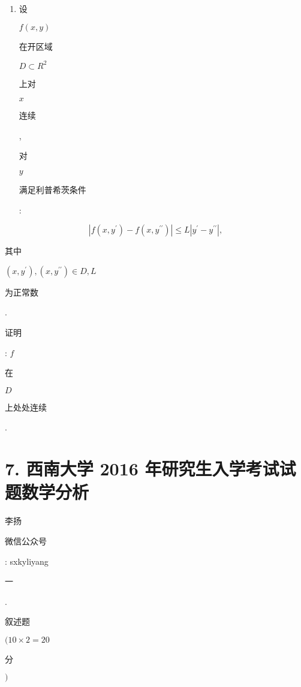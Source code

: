 \documentclass[10pt]{article}
\begin{document}
\begin{enumerate}
  \item \begin{CJK}{UTF8}{mj}设\end{CJK} $f(x, y)$ \begin{CJK}{UTF8}{mj}在开区域\end{CJK} $D \subset R^{2}$ \begin{CJK}{UTF8}{mj}上对\end{CJK} $x$ \begin{CJK}{UTF8}{mj}连续\end{CJK}, \begin{CJK}{UTF8}{mj}对\end{CJK} $y$ \begin{CJK}{UTF8}{mj}满足利普希茨条件\end{CJK}:

\end{enumerate}
$$
\left|f\left(x, y^{\prime}\right)-f\left(x, y^{\prime \prime}\right)\right| \leqslant L\left|y^{\prime}-y^{\prime \prime}\right|,
$$
\begin{CJK}{UTF8}{mj}其中\end{CJK} $\left(x, y^{\prime}\right),\left(x, y^{\prime \prime}\right) \in D, L$ \begin{CJK}{UTF8}{mj}为正常数\end{CJK}. \begin{CJK}{UTF8}{mj}证明\end{CJK}: $f$ \begin{CJK}{UTF8}{mj}在\end{CJK} $D$ \begin{CJK}{UTF8}{mj}上处处连续\end{CJK}.

\section{7. 西南大学 2016 年研究生入学考试试题数学分析}
\begin{CJK}{UTF8}{mj}李扬\end{CJK}

\begin{CJK}{UTF8}{mj}微信公众号\end{CJK}: sxkyliyang

\begin{CJK}{UTF8}{mj}一\end{CJK}. \begin{CJK}{UTF8}{mj}叙述题\end{CJK} $(10 \times 2=20$ \begin{CJK}{UTF8}{mj}分\end{CJK} $)$
\end{document}
